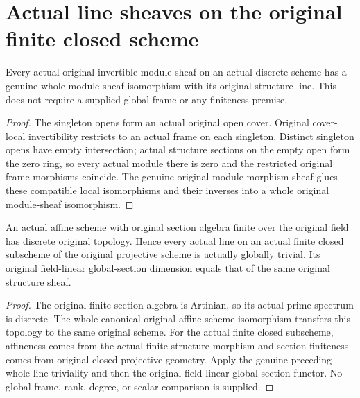 \section{Actual line sheaves on the original finite closed scheme}

\begin{theorem}
\label{thm:fc-discrete-scheme-line-triviality}
\leanok
{}
Every actual original invertible module sheaf on an actual discrete scheme
has a genuine whole module-sheaf isomorphism with its original structure
line. This does not require a supplied global frame or any finiteness premise.
\end{theorem}
\begin{proof}
The singleton opens form an actual original open cover. Original cover-local
invertibility restricts to an actual frame on each singleton. Distinct
singleton opens have empty intersection; actual structure sections on the
empty open form the zero ring, so every actual module there is zero and the
restricted original frame morphisms coincide. The genuine original module
morphism sheaf glues these compatible local isomorphisms and their inverses
into a whole original module-sheaf isomorphism.
\end{proof}

\begin{theorem}
\label{thm:fc-finite-closed-line-degree}
\leanok
{}
An actual affine scheme with original section algebra finite over the
original field has discrete original topology. Hence every actual line on
an actual finite closed subscheme of the original projective scheme is
actually globally trivial. Its original field-linear global-section
dimension equals that of the same original structure sheaf.
\end{theorem}
\begin{proof}
The original finite section algebra is Artinian, so its actual prime
spectrum is discrete. The whole canonical original affine scheme
isomorphism transfers this topology to the same original scheme.
For the actual finite closed subscheme, affineness comes from the actual
finite structure morphism and section finiteness comes from original closed
projective geometry. Apply the genuine preceding whole line triviality and
then the original field-linear global-section functor. No global frame,
rank, degree, or scalar comparison is supplied.
\end{proof}
